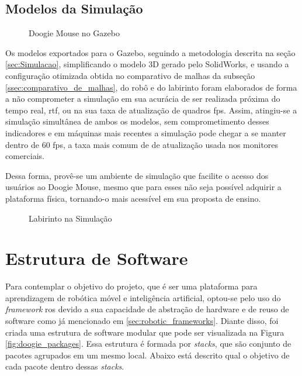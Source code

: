 \subsection{Modelos da Simulação}
\label{sec:modelos_sim}
\begin{figure}[H]
	\centering
	\caption{Doogie Mouse no Gazebo}
	\label{fig:doogie_gazebo_imgs}
\end{figure}
Os modelos exportados para o Gazebo, seguindo a metodologia descrita na seção \ref{sec:Simulacao}, simplificando o modelo 3D gerado pelo SolidWorks, e usando a configuração otimizada obtida no comparativo de malhas da subseção \ref{ssec:comparativo_de_malhas}, do robô e do labirinto foram elaborados de forma a não comprometer a simulação em sua acurácia de ser realizada próxima do tempo real, \gls*{rtf}, ou na sua taxa de atualização de quadros \gls*{fps}. Assim, atingiu-se a simulação simultânea de ambos os modelos, sem comprometimento desses indicadores e em máquinas mais recentes a simulação pode chegar a se manter dentro de 60 \gls*{fps}, a taxa mais comum de de atualização usada nos monitores comerciais.

Dessa forma, provê-se um ambiente de simulação que facilite o acesso dos usuários ao Doogie Mouse, mesmo que para esses não seja possível adquirir a plataforma física, tornando-o mais acessível em sua proposta de ensino.



\label{sec:modelos_sim}
\begin{figure}[H]
	\centering
	\caption{Labirinto na Simulação}
	\label{fig:minus_gazebo_imgs}
\end{figure}

\section{Estrutura de Software}
\label{sec:resultado_estrutura_de_software}
Para contemplar o objetivo do projeto, que é ser uma plataforma para aprendizagem de robótica móvel e inteligência artificial, optou-se pelo uso do \textit{framework} \gls*{ros} devido a sua capacidade de abstração de hardware e de reuso de software como já mencionado em \ref{sec:robotic_frameworks}. Diante disso, foi criada uma estrutura de software modular que pode ser visualizada na Figura \ref{fig:doogie_packages}. Essa estrutura é formada por \textit{stacks}, que são conjunto de pacotes agrupados em um mesmo local. Abaixo está descrito qual o objetivo de cada pacote dentro dessas \textit{stacks}.

